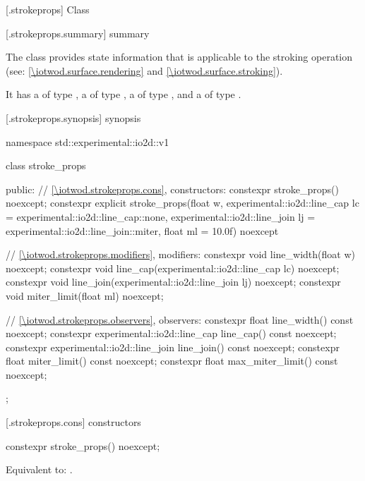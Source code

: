 
 [\iotwod.strokeprops] {Class }

 [\iotwod.strokeprops.summary] { summary}

\pnum
The  class provides state information that is applicable to the stroking operation (see: \ref{\iotwod.surface.rendering} and \ref{\iotwod.surface.stroking}).

\pnum
It has a  of type , a  of type , a  of type , and a  of type .

 [\iotwod.strokeprops.synopsis] { synopsis}

\begin{codeblock}
namespace std::experimental::io2d::v1 {
  class stroke_props {
  public:
    // \ref{\iotwod.strokeprops.cons}, constructors:
    constexpr stroke_props() noexcept;
    constexpr explicit stroke_props(float w,
      experimental::io2d::line_cap lc = experimental::io2d::line_cap::none,
      experimental::io2d::line_join lj = experimental::io2d::line_join::miter,
      float ml = 10.0f) noexcept    

    // \ref{\iotwod.strokeprops.modifiers}, modifiers:
    constexpr void line_width(float w) noexcept;
    constexpr void line_cap(experimental::io2d::line_cap lc) noexcept;
    constexpr void line_join(experimental::io2d::line_join lj) noexcept;
    constexpr void miter_limit(float ml) noexcept;
    
    // \ref{\iotwod.strokeprops.observers}, observers:
    constexpr float line_width() const noexcept;
    constexpr experimental::io2d::line_cap line_cap() const noexcept;
    constexpr experimental::io2d::line_join line_join() const noexcept;
    constexpr float miter_limit() const noexcept;
    constexpr float max_miter_limit() const noexcept;
  };
}
\end{codeblock}

 [\iotwod.strokeprops.cons] { constructors}

%
\begin{itemdecl}
constexpr stroke_props() noexcept;
\end{itemdecl}
\begin{itemdescr}
\pnum
\effects
Equivalent to: .
\end{itemdescr}

